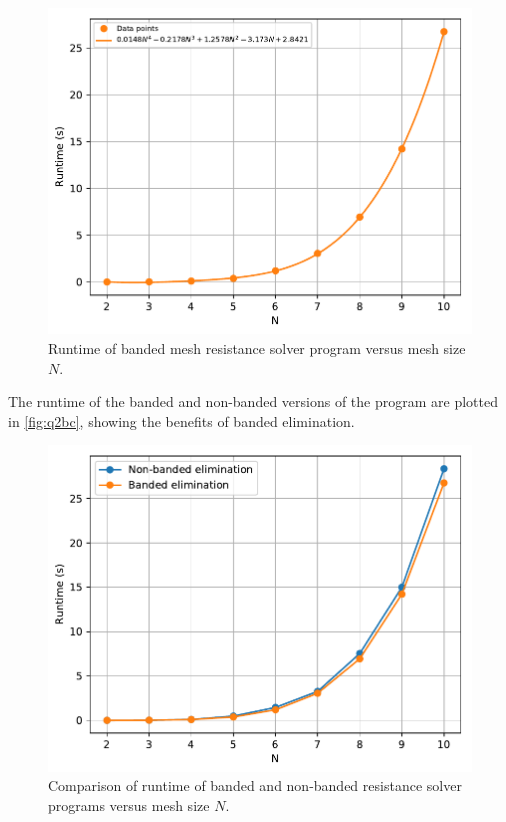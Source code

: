 \documentclass[a4paper,titlepage]{article}
\begin{document}
	\begin{figure}[!htb]
		\centering
		\includegraphics[width=\columnwidth]{plots/q2c.pdf}
		\caption
		{Runtime of banded mesh resistance solver program versus mesh size $N$.}
		\label{fig:q2c}
	\end{figure}


	The runtime of the banded and non-banded versions of the program are plotted in \autoref{fig:q2bc}, showing the benefits of banded elimination.

	\begin{figure}[!htb]
		\centering
		\includegraphics[width=\columnwidth]{plots/q2bc.pdf}
		\caption
		{Comparison of runtime of banded and non-banded resistance solver programs versus mesh size $N$.}
		\label{fig:q2bc}
	\end{figure}
	
\end{document}
